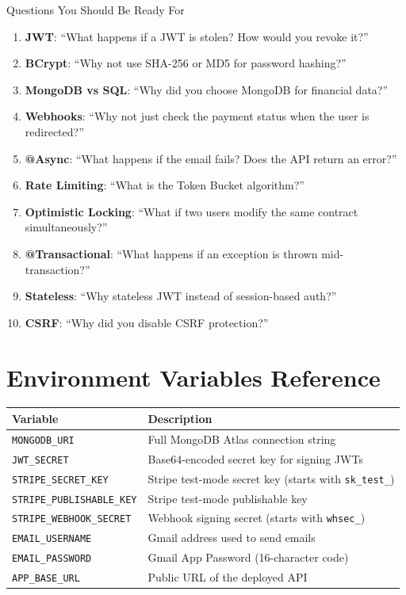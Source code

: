 \documentclass[11pt, a4paper]{article}
\begin{document}
\begin{interviewbox}{Questions You Should Be Ready For}
\begin{enumerate}
    \item \textbf{JWT}: ``What happens if a JWT is stolen? How would you revoke it?''
    \item \textbf{BCrypt}: ``Why not use SHA-256 or MD5 for password hashing?''
    \item \textbf{MongoDB vs SQL}: ``Why did you choose MongoDB for financial data?''
    \item \textbf{Webhooks}: ``Why not just check the payment status when the user is redirected?''
    \item \textbf{@Async}: ``What happens if the email fails? Does the API return an error?''
    \item \textbf{Rate Limiting}: ``What is the Token Bucket algorithm?''
    \item \textbf{Optimistic Locking}: ``What if two users modify the same contract simultaneously?''
    \item \textbf{@Transactional}: ``What happens if an exception is thrown mid-transaction?''
    \item \textbf{Stateless}: ``Why stateless JWT instead of session-based auth?''
    \item \textbf{CSRF}: ``Why did you disable CSRF protection?''
\end{enumerate}
\end{interviewbox}


\appendix
\section{Environment Variables Reference}

\begin{longtable}{@{}lp{8cm}@{}}
\toprule
\textbf{Variable} & \textbf{Description} \\
\midrule
\texttt{MONGODB\_URI} & Full MongoDB Atlas connection string \\
\texttt{JWT\_SECRET} & Base64-encoded secret key for signing JWTs \\
\texttt{STRIPE\_SECRET\_KEY} & Stripe test-mode secret key (starts with \texttt{sk\_test\_}) \\
\texttt{STRIPE\_PUBLISHABLE\_KEY} & Stripe test-mode publishable key \\
\texttt{STRIPE\_WEBHOOK\_SECRET} & Webhook signing secret (starts with \texttt{whsec\_}) \\
\texttt{EMAIL\_USERNAME} & Gmail address used to send emails \\
\texttt{EMAIL\_PASSWORD} & Gmail App Password (16-character code) \\
\texttt{APP\_BASE\_URL} & Public URL of the deployed API \\
\bottomrule
\end{longtable}
\end{document}
